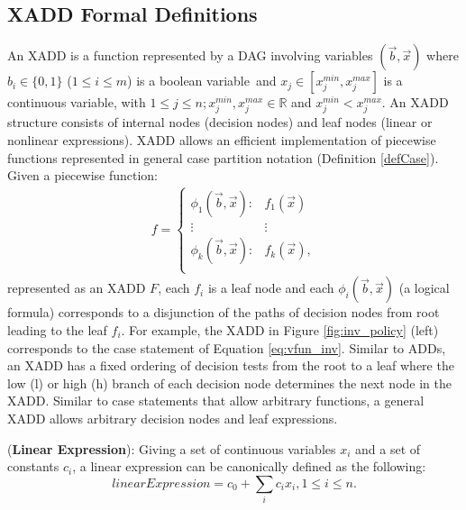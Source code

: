 \documentclass[twoside,11pt]{article}
\newenvironment{mydef}[1][Definition]{\begin{trivlist}
\item[\hskip \labelsep {\bfseries #1}]}{\end{trivlist}}
\begin{document}
\subsection{XADD Formal Definitions}
\label{xaddformal}
An XADD is a function represented by a DAG involving variables $(\vec{b},\vec{x})$ where $b_i \in \{ 0,1 \}$ ($1 \leq i \leq m$) is a  boolean variable$\,$
and $x_j \in \left[ x_j^{min}, x_j^{max}\right]$ is a continuous variable, with $1 \leq j \leq n; x_j^{min}, x_j^{max} \in \mathbb{R}$ and  $x_j^{min}< x_j^{max}$.
An XADD structure consists of internal nodes (decision nodes) and leaf nodes (linear or nonlinear expressions).
XADD allows an efficient implementation of piecewise functions represented in general case partition notation (Definition \ref{defCase}).
{%
Given a piecewise function:
\begin{align}
f = 
\begin{cases}
  \phi_1(\vec{b},\vec{x}): & f_1 (\vec{x})\\ 
 \vdots&\vdots\\ 
  \phi_k(\vec{b},\vec{x}): & f_k(\vec{x}), \\ 
\end{cases} \label{eq:function_xadd}
\end{align}
}
represented as an XADD $F$, each $f_i$ is a leaf node and each $\phi_i(\vec{b},\vec{x})$ (a logical formula) corresponds to a disjunction of the paths of decision nodes from root leading to the leaf $f_i$. For example, the XADD in Figure \ref{fig:inv_policy} (left) corresponds to the case statement of Equation \ref{eq:vfun_inv}.
Similar to ADDs, an XADD has a fixed ordering of decision tests from the root to a leaf where the low (l) or high (h) branch of each decision node determines the next node in the XADD. Similar to case statements that allow arbitrary functions,  a general XADD allows arbitrary decision nodes and leaf expressions. 

\begin{mydef}(\textbf{Linear Expression}):
Giving a set of continuous variables $x_i$ and a set of constants $c_i$, a linear expression can be canonically defined  as the following:
\begin{equation}
\mathit{linearExpression} = c_0+\sum_{i} c_i x_i , 1 \leq i \leq n. 
\label{Eq:canonical}
\end{equation}
\end{mydef}
\end{document}
